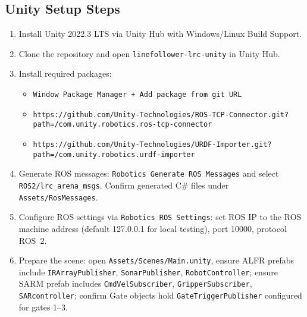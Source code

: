 \documentclass[12pt]{article}
\begin{document}
\subsection{Unity Setup Steps}
\begin{enumerate}
    \item Install Unity 2022.3 LTS via Unity Hub with Windows/Linux Build Support.
    \item Clone the repository and open \texttt{linefollower-lrc-unity} in Unity Hub.
    \item Install required packages:
    \begin{itemize}
        \item \texttt{Window \textrightarrow{} Package Manager \textrightarrow{} + \textrightarrow{} Add package from git URL}
        \item \texttt{https://github.com/Unity-Technologies/ROS-TCP-Connector.git?path=/com.unity.robotics.ros-tcp-connector}
        \item \texttt{https://github.com/Unity-Technologies/URDF-Importer.git?path=/com.unity.robotics.urdf-importer}
    \end{itemize}
    \item Generate ROS messages: \texttt{Robotics \textrightarrow{} Generate ROS Messages} and select \texttt{ROS2/lrc\_arena\_msgs}. Confirm generated C\# files under \texttt{Assets/RosMessages}.
    \item Configure ROS settings via \texttt{Robotics \textrightarrow{} ROS Settings}: set ROS IP to the ROS machine address (default 127.0.0.1 for local testing), port 10000, protocol ROS~2.
    \item Prepare the scene: open \texttt{Assets/Scenes/Main.unity}, ensure ALFR prefabs include \texttt{IRArrayPublisher}, \texttt{SonarPublisher}, \texttt{RobotController}; ensure SARM prefab includes \texttt{CmdVelSubscriber}, \texttt{GripperSubscriber}, \texttt{SARcontroller}; confirm Gate objects hold \texttt{GateTriggerPublisher} configured for gates 1--3.
\end{enumerate}
\end{document}

